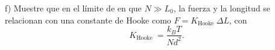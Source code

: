 f) Muestre que en el límite de en que $N \gg L_0$, la fuerza y la longitud se relacionan con una constante de Hooke como $F=K_{\text {Hooke }} \Delta L$, con
$$
K_{\text {Hooke }}=\frac{k_B T}{N d^2} .
$$